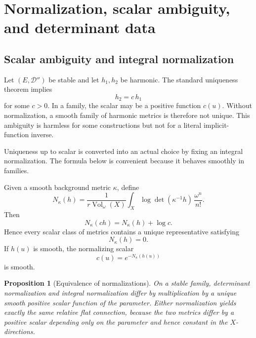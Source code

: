 \documentclass[11pt,reqno]{amsart}
\newtheorem{proposition}[theorem]{Proposition}
\theoremstyle{definition}
\theoremstyle{remark}
\newcommand{\cD}{\mathcal D}
\newcommand{\Vol}{\operatorname{Vol}}
\begin{document}
\section{Normalization, scalar ambiguity, and determinant data}\label{app:normalization}

\subsection{Scalar ambiguity and integral normalization}

Let $(E,\cD'')$ be stable and let $h_1,h_2$ be harmonic.  The standard uniqueness theorem implies
\[
  h_2=c\,h_1
\]
for some $c>0$.  In a family, the scalar may be a positive function $c(u)$.  Without normalization, a smooth family of harmonic metrics is therefore not unique.  This ambiguity is harmless for some constructions but not for a literal implicit-function inverse.


Uniqueness up to scalar is converted into an actual choice by fixing an integral normalization.  The formula below is convenient because it behaves smoothly in families.


Given a smooth background metric $\kappa$, define
\[
  N_\kappa(h)
  =\frac1{r\Vol_\omega(X)}
  \int_X\log\det(\kappa^{-1}h)\,\frac{\omega^n}{n!}.
\]
Then
\[
  N_\kappa(ch)=N_\kappa(h)+\log c.
\]
Hence every scalar class of metrics contains a unique representative satisfying
\[
  N_\kappa(h)=0.
\]
If $h(u)$ is smooth, the normalizing scalar
\[
  c(u)=e^{-N_\kappa(h(u))}
\]
is smooth.

\begin{proposition}[Equivalence of normalizations]\label{prop:equiv-normalizations}
On a stable family, determinant normalization and integral normalization differ by multiplication by a unique smooth positive scalar function of the parameter.  Either normalization yields exactly the same relative flat connection, because the two metrics differ by a positive scalar depending only on the parameter and hence constant in the $X$-directions.
\end{proposition}
\end{document}
